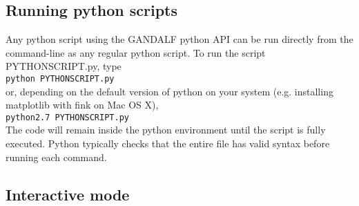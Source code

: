 \documentclass[a4paper]{article}
\newcommand{\var}[1]{\texttt{#1}}
\begin{document}
\subsection{Running python scripts}

\noindent Any python script using the GANDALF python API can be run directly from the command-line as any regular python script.  To run the script PYTHONSCRIPT.py, type \\
\newline
\var{python PYTHONSCRIPT.py} \\
\newline
or, depending on the default version of python on your system (e.g. installing matplotlib with fink on Mac OS X), \\
\newline
\var{python2.7 PYTHONSCRIPT.py} \\
\newline
The code will remain inside the python environment until the script is fully executed.  Python typically checks that the entire file has valid syntax before running each command.



\subsection{Interactive mode}
\end{document}
